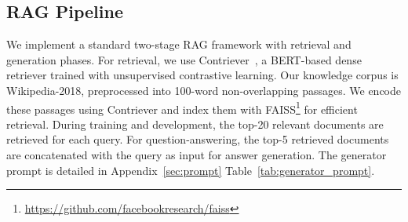 \subsection{RAG Pipeline}  
We implement a standard two-stage RAG framework with retrieval and generation phases. For retrieval, we use Contriever~\cite{DBLP:journals/tmlr/IzacardCHRBJG22}, a BERT-based dense retriever trained with unsupervised contrastive learning. Our knowledge corpus is Wikipedia-2018, preprocessed into 100-word non-overlapping passages. We encode these passages using Contriever and index them with FAISS\footnote{\url{https://github.com/facebookresearch/faiss}} for efficient retrieval. During training and development, the top-20 relevant documents are retrieved for each query. For question-answering, the top-5 retrieved documents are concatenated with the query as input for answer generation. The generator prompt is detailed in Appendix~\ref{sec:prompt} Table~\ref{tab:generator_prompt}.





